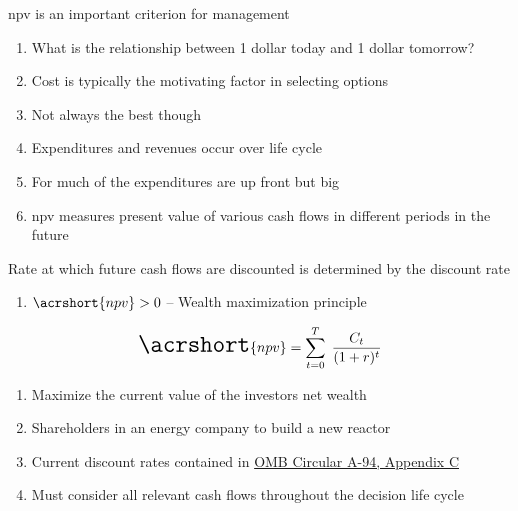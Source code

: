 \documentclass[aspectratio=1610,pdftex,dvipsnames,compress,xcolor={dvipsnames}]{beamer}
\newcommand{\acf}{\acrfull} %
\newcommand{\acs}{\acrshort} %
\newcommand{\acsp}{\acrshortpl} %
\begin{document}
\addtocounter{framenumber}{-1}
\begin{frame}{\acf{npv} is an important criterion for management}
    \begin{enumerate}[series=outerlist,topsep=0pt,itemsep=21pt,leftmargin=*,label=(\arabic*)]
        \item[]What is the relationship between 1 dollar today and 1 dollar tomorrow?
        \item[]Cost is typically the motivating factor in selecting options
        \item[]Not always the best though
        \item[]Expenditures and revenues occur over life cycle
        \item[]For \acsp{npp} much of the expenditures are up front but big
        \item[]\acs{npv} measures present value of various cash flows in different periods in the future
    \end{enumerate}
\end{frame}


\begin{frame}{Rate at which future cash flows are discounted is determined by the discount rate}
    \begin{enumerate}[series=outerlist,topsep=0pt,itemsep=17pt,leftmargin=*,label=(\arabic*)]
        \item[]$\acs{npv} > 0$ -- Wealth maximization principle
    \end{enumerate}

    \begin{equation}
        \LARGE
        \acs{npv} = \sum_{t=0}^T \; \frac{C_t}{(1 + r)^t}
    \end{equation}

    \begin{enumerate}[series=outerlist,topsep=0pt,itemsep=17pt,leftmargin=*,label=(\arabic*)]
        \item[]Maximize the current value of the investors net wealth
        \item[]Shareholders in an energy company to build a new reactor
        \item[]Current discount rates contained in \href{https://www.federalregister.gov/documents/2023/12/29/2023-28727/discount-rates-for-cost-effectiveness-analysis-of-federal-programs}{OMB Circular A-94, Appendix C}
        \item[]Must consider all relevant cash flows throughout the decision life cycle
    \end{enumerate}
\end{frame}
\end{document}
